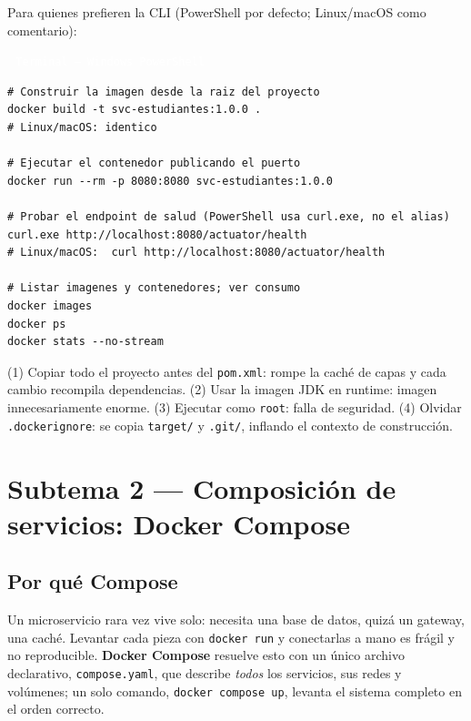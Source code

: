 \documentclass[11pt,a4paper]{article}
\newcommand{\archivo}[1]{\par\vspace{5pt}\noindent\colorbox{uteqBlue}{\textcolor{white}{\small\,\faFileIco\ \texttt{#1}\,}}\par\nopagebreak\vspace{1pt}}
\newcommand{\faFileIco}{\raisebox{-0.1ex}{\scriptsize$\square$}}
\begin{document}
\begin{ideabox}
Para quienes prefieren la CLI (PowerShell por defecto; Linux/macOS como comentario):
\end{ideabox}

\archivo{Terminal --- Windows PowerShell}
\begin{lstlisting}[numbers=none]
# Construir la imagen desde la raiz del proyecto
docker build -t svc-estudiantes:1.0.0 .
# Linux/macOS: identico

# Ejecutar el contenedor publicando el puerto
docker run --rm -p 8080:8080 svc-estudiantes:1.0.0

# Probar el endpoint de salud (PowerShell usa curl.exe, no el alias)
curl.exe http://localhost:8080/actuator/health
# Linux/macOS:  curl http://localhost:8080/actuator/health

# Listar imagenes y contenedores; ver consumo
docker images
docker ps
docker stats --no-stream
\end{lstlisting}

\begin{warnbox}
(1) Copiar todo el proyecto antes del \texttt{pom.xml}: rompe la cach\'e de capas y cada cambio recompila dependencias. (2) Usar la imagen JDK en runtime: imagen innecesariamente enorme. (3) Ejecutar como \texttt{root}: falla de seguridad. (4) Olvidar \texttt{.dockerignore}: se copia \texttt{target/} y \texttt{.git/}, inflando el contexto de construcci\'on.
\end{warnbox}

\section{Subtema 2 --- Composici\'on de servicios: Docker Compose}

\subsection{Por qu\'e Compose}

Un microservicio rara vez vive solo: necesita una base de datos, quiz\'a un gateway, una cach\'e. Levantar cada pieza con \texttt{docker run} y conectarlas a mano es fr\'agil y no reproducible. \textbf{Docker Compose} resuelve esto con un \'unico archivo declarativo, \texttt{compose.yaml}, que describe \emph{todos} los servicios, sus redes y vol\'umenes; un solo comando, \texttt{docker compose up}, levanta el sistema completo en el orden correcto.
\end{document}
